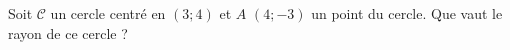 %
%
    Soit \(\mathscr{C}\) un cercle centré en \((3;4)\) et \(A\) \((4;-3)\) un point du cercle. Que vaut le rayon de ce cercle ?
